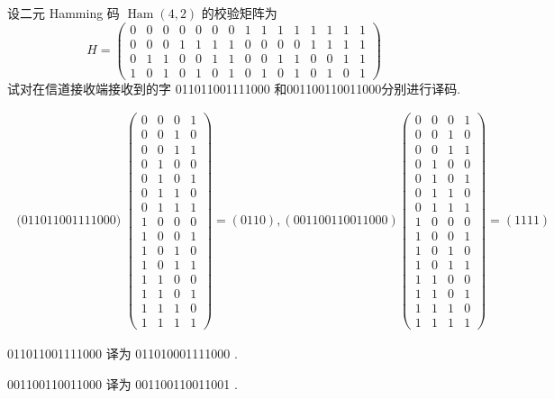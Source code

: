 \begin{exercise}
 设二元 Hamming 码 $ \operatorname{Ham}(4,2) $ 的校验矩阵为
$$
H=\left(\begin{array}{lllllllllllllll}
0 & 0 & 0 & 0 & 0 & 0 & 0 & 1 & 1 & 1 & 1 & 1 & 1 & 1 & 1 \\
0 & 0 & 0 & 1 & 1 & 1 & 1 & 0 & 0 & 0 & 0 & 1 & 1 & 1 & 1 \\
0 & 1 & 1 & 0 & 0 & 1 & 1 & 0 & 0 & 1 & 1 & 0 & 0 & 1 & 1 \\
1 & 0 & 1 & 0 & 1 & 0 & 1 & 0 & 1 & 0 & 1 & 0 & 1 & 0 & 1
\end{array}\right)
$$
试对在信道接收端接收到的字 011011001111000 和001100110011000分别进行译码.
\end{exercise}
\begin{solution}
    $$\begin{array}{c}
\text { (011011001111000) }\left(\begin{array}{cccc}
0 & 0 & 0 & 1 \\
0 & 0 & 1 & 0 \\
0 & 0 & 1 & 1 \\
0 & 1 & 0 & 0 \\
0 & 1 & 0 & 1 \\
0 & 1 & 1 & 0 \\
0 & 1 & 1 & 1 \\
1 & 0 & 0 & 0 \\
1 & 0 & 0 & 1 \\
1 & 0 & 1 & 0 \\
1 & 0 & 1 & 1 \\
1 & 1 & 0 & 0 \\
1 & 1 & 0 & 1 \\
1 & 1 & 1 & 0 \\
1 & 1 & 1 & 1
\end{array}\right)=(0110), (001100110011000)\left(\begin{array}{llll}
0 & 0 & 0 & 1 \\
0 & 0 & 1 & 0 \\
0 & 0 & 1 & 1 \\
0 & 1 & 0 & 0 \\
0 & 1 & 0 & 1 \\
0 & 1 & 1 & 0 \\
0 & 1 & 1 & 1 \\
1 & 0 & 0 & 0 \\
1 & 0 & 0 & 1 \\
1 & 0 & 1 & 0 \\
1 & 0 & 1 & 1 \\
1 & 1 & 0 & 0 \\
1 & 1 & 0 & 1 \\
1 & 1 & 1 & 0 \\
1 & 1 & 1 & 1
\end{array}\right)=(1111)
\end{array}
$$

011011001111000 译为 011010001111000 .

001100110011000 译为 001100110011001 .
\end{solution}


